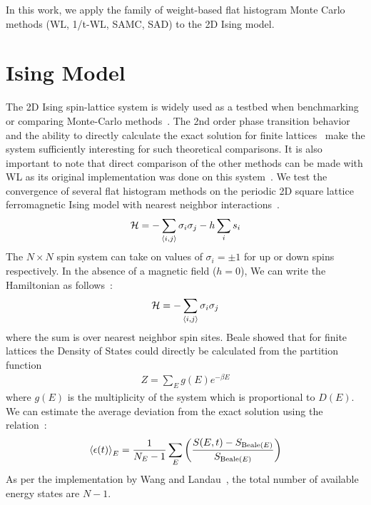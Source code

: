 \documentclass[letterpaper,twocolumn,amsmath,amssymb,pre,aps,10pt]{revtex4-1}
\begin{document}
In this work, we apply the family of weight-based flat histogram Monte
Carlo methods (WL, 1/t-WL, SAMC, SAD) to the 2D Ising model.

\section{Ising Model}
The 2D Ising spin-lattice system is widely used as a testbed when
benchmarking or comparing Monte-Carlo
methods~\cite{ferdinand1969bounded, wang1999transition, trebst2004optimizing}. The 2nd order
phase transition behavior and the ability to directly calculate the
exact solution for finite lattices~\cite{beale1996exact, haggkvist2004computation} make the
system sufficiently interesting for such theoretical comparisons. It is
also important to note that direct comparison of the other methods can
be made with WL as its original implementation was done on this
system~\cite{wang2001determining,wang2001efficient}.
We test the convergence of several flat histogram methods
on the periodic 2D square lattice ferromagnetic Ising model with nearest
neighbor interactions~\cite{landau2004new}.
\begin{align}
\mathcal{H} = -\sum_{\braket{i,j}} \sigma_i \sigma_j - h \sum_i s_i
\end{align}
The $N\times N$ spin system can take on values of $\sigma_i = \pm 1$
for up or down spins respectively. In the absence of a magnetic field ($h =
0$), We can write the Hamiltonian as follows~\cite{onsager1944crystal,
kaufman1949crystal}:
\begin{align}
\mathcal{H} = -\sum_{\braket{i,j}} \sigma_i \sigma_j
\end{align}
where the sum is over nearest neighbor spin sites. Beale showed that for finite
lattices the Density of States could directly be calculated from the partition
function~\cite{beale1996exact}
\begin{align}
Z = \sum_E g(E) e^{-{\beta E}}
\end{align}
where $g(E)$ is the multiplicity of the system which is proportional to
$D(E)$. We can estimate the average deviation from the exact solution
using the relation~\cite{schneider2017convergence, shakirov2018convergence,
barash2017control}:
\begin{align}
\braket{\epsilon(t)}_E = \frac{1}{N_E - 1} \sum_E \left( \frac{S(E,t) - S_{\text{Beale}(E)}}{S_{\text{Beale}(E)}} \right)
\end{align}
As per the implementation by Wang and
Landau~\cite{wang2001determining}, the total number of available energy
states are $N-1$.
\end{document}
